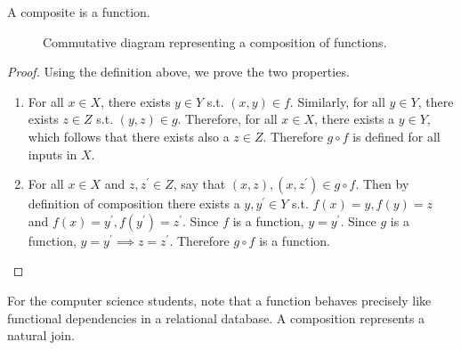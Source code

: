   \begin{theorem}[Compositions]
    \label{thm:compositions}
    A composite is a function. 
    \begin{figure}[H]
      \centering 
      \caption{Commutative diagram representing a composition of functions.} 
      \label{fig:composition}
    \end{figure}
  \end{theorem}
  \begin{proof}
    Using the definition above, we prove the two properties. 
    \begin{enumerate}
      \item For all $x \in X$, there exists $y \in Y$ s.t. $(x, y) \in f$. Similarly, for all $y \in Y$, there exists $z \in Z$ s.t. $(y, z) \in g$. Therefore, for all $x \in X$, there exists a $y \in Y$, which follows that there exists also a $z \in Z$. Therefore $g \circ f$ is defined for all inputs in $X$. 
      \item For all $x \in X$ and $z, z^\prime \in Z$, say that $(x, z), (x, z^\prime) \in g \circ f$. Then by definition of composition there exists a $y, y^\prime \in Y$ s.t. $f(x) = y, f(y) = z$ and $f(x) = y^\prime, f(y^\prime) = z^\prime$. Since $f$ is a function, $y = y^\prime$. Since $g$ is a function, $y = y^\prime \implies z = z^\prime$. Therefore $g \circ f$ is a function. 
    \end{enumerate}
  \end{proof}

  For the computer science students, note that a function behaves precisely like functional dependencies in a relational database. A composition represents a natural join. 

